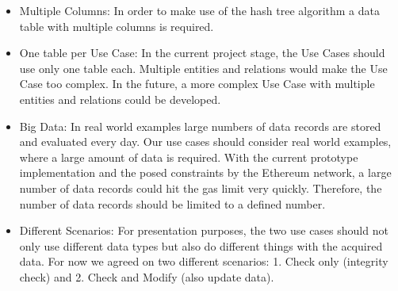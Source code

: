 \begin{itemize}
\item Multiple Columns:
In order to make use of the hash tree algorithm a data table with multiple columns is required.
\item One table per Use Case:
In the current project stage, the Use Cases should use only one table each. Multiple entities and relations would make the Use Case too complex. In the future, a more complex Use Case with multiple entities and relations could be developed.
\item Big Data:
In real world examples large numbers of data records are stored and evaluated every day. Our use cases should consider real world examples, where a large amount of data is required. With the current prototype implementation and the posed constraints by the Ethereum network, a large number of data records could hit the gas limit very quickly. Therefore, the number of data records should be limited to a defined number.
\item Different Scenarios:
For presentation purposes, the two use cases should not only use different data types but also do different things with the acquired data. For now we agreed on two different scenarios: 1. Check only (integrity check) and 2. Check and Modify (also update data).
\end{itemize}






